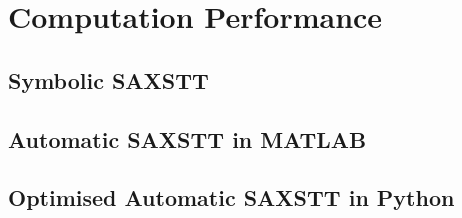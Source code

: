 \chapter{Computation Performance}

\section{Symbolic SAXSTT}

\section{Automatic SAXSTT in MATLAB}

\section{Optimised Automatic SAXSTT in Python}